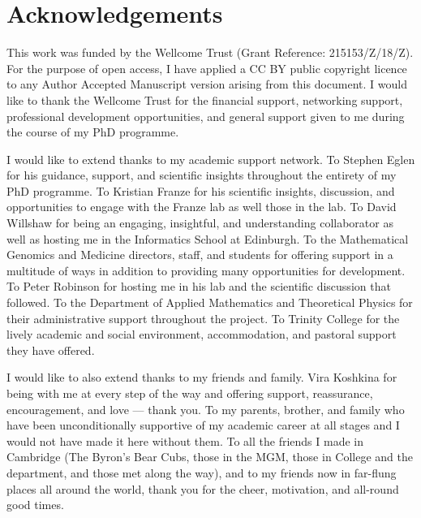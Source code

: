 \chapter*{Acknowledgements}
This work was funded by the Wellcome Trust (Grant Reference: 215153/Z/18/Z). For the purpose of open access, I have applied a CC BY public copyright licence to any Author Accepted Manuscript version arising from this document. I would like to thank the Wellcome Trust for the financial support, networking support, professional development opportunities, and general support given to me during the course of my PhD programme.

I would like to extend thanks to my academic support network. To Stephen Eglen for his guidance, support, and scientific insights throughout the entirety of my PhD programme. To Kristian Franze for his scientific insights, discussion, and opportunities to engage with the Franze lab as well those in the lab. To David Willshaw for being an engaging, insightful, and understanding collaborator as well as hosting me in the Informatics School at Edinburgh. To the Mathematical Genomics and Medicine directors, staff, and students for offering support in a multitude of ways in addition to providing many opportunities for development. To Peter Robinson for hosting me in his lab and the scientific discussion that followed. To the Department of Applied Mathematics and Theoretical Physics for their administrative support throughout the project. To Trinity College for the lively academic and social environment, accommodation, and pastoral support they have offered. 

I would like to also extend thanks to my friends and family. Vira Koshkina for being with me at every step of the way and offering support, reassurance, encouragement, and love --- thank you. To my parents, brother, and family who have been unconditionally supportive of my academic career at all stages and I would not have made it here without them. To all the friends I made in Cambridge (The Byron's Bear Cubs, those in the MGM, those in College and the department, and those met along the way), and to my friends now in far-flung places all around the world, thank you for the cheer, motivation, and all-round good times.
 
